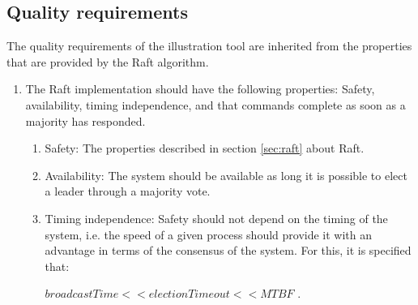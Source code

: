 \subsection{Quality requirements}
The quality requirements of the illustration tool are inherited from the properties that are provided by the Raft algorithm.
	\begin{enumerate}
	\item The Raft implementation should have the following properties: Safety, availability, timing independence, and that commands complete as soon as a majority has responded.
		\begin{enumerate}
		\item Safety: The properties described in section \ref{sec:raft} about Raft.
		\item Availability: The system should be available as long it is possible to elect a leader through a majority vote.
		\item Timing independence: Safety should not depend on the timing of the system, i.e. the speed of a given process should provide it with an advantage in terms of the consensus of the system. For this, it is specified that:
		\begin{center}
		$broadcastTime << electionTimeout << MTBF$ \cite{Raft}.
		\end{center}
		\end{enumerate}
	\end{enumerate}

